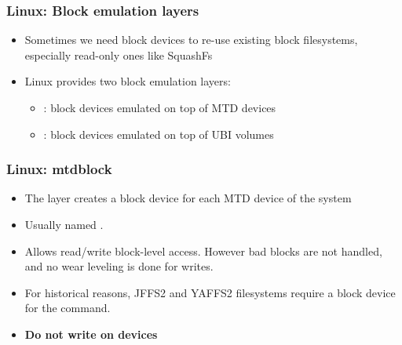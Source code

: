 \begin{frame}
  \frametitle{Linux: Block emulation layers}
  \begin{itemize}
  \item Sometimes we need block devices to re-use existing block
    filesystems, especially read-only ones like SquashFs
  \item Linux provides two block emulation layers:
    \begin{itemize}
    \item {}: block devices emulated on top of MTD devices
    \item {}: block devices emulated on top of UBI volumes
    \end{itemize}
  \end{itemize}
\end{frame}

\begin{frame}
  \frametitle{Linux: mtdblock}
  \begin{itemize}
  \item The  layer creates a block device for each MTD
    device of the system
  \item Usually named .
  \item Allows read/write block-level access. However bad blocks are not
    handled, and no wear leveling is done for writes.
  \item For historical reasons, JFFS2 and YAFFS2 filesystems require a
    block device for the  command.
  \item {\bf Do not write on  devices}
  \end{itemize}
\end{frame}

